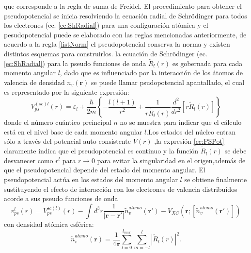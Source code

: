 \documentclass[12pt,a4paper, oneside]{book}
\begin{document}
   que corresponde a la regla de suma de Freidel.
   \newline \newline
   El procedimiento para obtener el pseudopotencial  se inicia resolviendo la ecuaci\'on radial de Schr\"odinger para todos los electrones (ec. \ref{ec:ShRadial}) para una configuraci\'on at\'omica y el pesudopotencial puede se elaborado con las reglas mencionadas anteriormente, de acuerdo a la regla \ref{listNorm} el pseudopotencial conserva la norma y existen distintos esquemas para construirlos.
   \newline
   la ecuaci\'on de Schr\"odinger (ec. \ref{ec:ShRadial}) para la pseudo funciones de onda $\tilde{R}_l (r)$ es gobernada para cada momento angular $l$, dado que es influenciado por la interacci\'on de los \'atomos de valencia de densidad $n_v (\pmb{r})$ se puede llamar psudopotencial apantallado, el cual es representado por la siguiente expresi\'on:
   \begin{equation}
   V_{ps}^{(sc)l} (r) = \varepsilon_l + \frac{\hbar}{2m} \left\{-\frac{l (l+1)}{r^2} + \frac{1}{r \tilde{R}_l (r)} \frac{d^2}{dr^2} [r \tilde{R}_l (r)]\right\} \label{ec:PSPot}
   \end{equation}
   donde el n\'umero cu\'antico preincipal $n$ no se muestra para indicar que el c\'alculo est\'a en el nivel base de cada momento angular $l$.Los estados del n\'ucleo entran s\'olo a trav\'es del potencial auto consistente $V(r)$ ,la expresi\'on \ref{ec:PSPot} claramente indica que el pseudopotencial es continuo y la funci\'on $\tilde{R}_l (r)$ se debe desvanecer como $r^l$ para $r \rightarrow 0$ para evitar la singularidad en el origen,adem\'as de que el pseudopotencial depende del estado del momento angular.
   \newline
   El pseudopotencial act\'ua en los estados del momento angular $l$ se obtiene finalmente sustituyendo el efecto de interacci\'on con los electrones de valencia distribuidos acorde a sus pseudo funciones de onda
   \begin{equation}
   v_{ps}^l (r) = V_{ps}^{sc(l)} (r) - \int d^3 r \frac{1}{|\pmb{r}-\pmb{r'}|} \tilde{n}_v^{atomo} (\pmb{r'}) - V_{XC} (\pmb{r}; [\tilde{n}_v^{atomo} (\pmb{r'})]) \label{ec:pseudoSC1}
   \end{equation}   
   con densidad at\'omica esf\'erica:
   \begin{equation}
   \tilde{n}_v^{atomo} (\pmb{r})= \frac{1}{4 \pi} \sum_{l=0}^{l_{max}} \sum_{m=-l}^{l} |\tilde{R}_l (r)|^2. \label{ec:densAtomo}
   \end{equation}
\end{document}
